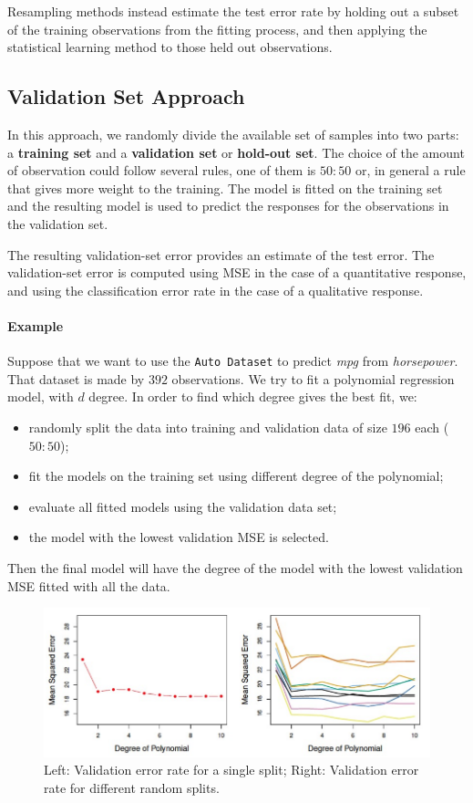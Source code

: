 Resampling methods instead estimate the test error rate by holding out a subset of the training observations from the fitting process, and then applying the statistical learning method to those held out observations.

\subsection*{Validation Set Approach}
In this approach, we randomly divide the available set of samples into two parts: a \textbf{training set} and a \textbf{validation set} or \textbf{hold-out set}. The choice of the amount of observation could follow several rules, one of them is $50:50$ or, in general a rule that gives more weight to the training.
The model is fitted on the training set and the resulting model is used to predict the responses for the observations in the validation set.

The resulting validation-set error provides an estimate of the test error. The validation-set error is computed using MSE in the case of a quantitative response, and using the classification error rate in the case of a qualitative response.

\paragraph*{Example}
Suppose that we want to use the \texttt{Auto Dataset} to predict \textit{mpg} from \textit{horsepower}. That dataset is made by $392$ observations. We try to fit a polynomial regression model, with $d$ degree. In order to find which degree gives the best fit, we:
\begin{itemize}
    \item randomly split the data into training and validation data of size $196$ each ($50:50$);
    \item fit the models on the training set using different degree of the polynomial;
    \item evaluate all fitted models using the validation data set;
    \item the model with the lowest validation MSE is selected.
\end{itemize}
Then the final model will have the degree of the model with the lowest validation MSE fitted with all the data.

\begin{figure}[ht]
    \centering
    \includegraphics[width=0.8\linewidth]{./figures/chapter_4/lec_15_validation_set.png}
    \caption{Left: Validation error rate for a single split; Right: Validation error rate for different random splits.}
    \label{fig:lec_15_validation_set}
\end{figure}

